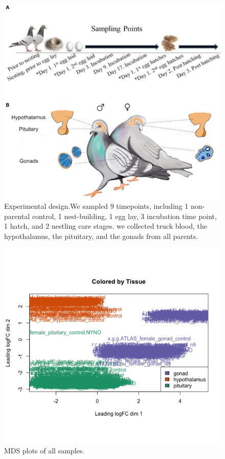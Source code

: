 \documentclass[10pt,letterpaper]{article}
\begin{document}
\begin{figure}
\centering
\includegraphics{characterization_manuscript_files/figure-latex/unnamed-chunk-2-1.pdf}
\caption{Experimental design.We sampled 9 timepoints, including 1
non-parental control, 1 nest-building, 1 egg lay, 3 incubation time
point, 1 hatch, and 2 nestling care stages. we collected truck blood,
the hypothalamus, the pituitary, and the gonads from all parents.}
\end{figure}

\begin{figure}
\centering
\includegraphics{characterization_manuscript_files/figure-latex/unnamed-chunk-3-1.pdf}
\caption{MDS plots of all samples.}
\end{figure}
\end{document}
